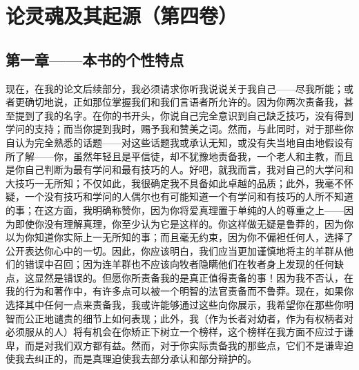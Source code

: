 

\section{论灵魂及其起源（第四卷）}

\par

\par


\subsection{第一章——本书的个性特点}

现在，在我的论文后续部分，我必须请求你听我说说关于我自己——尽我所能；或者更确切地说，正如那位掌握我们和我们言语者所允许的。因为你两次责备我，甚至提到了我的名字。在你的书开头，你说自己完全意识到自己缺乏技巧，没有得到学问的支持；而当你提到我时，赐予我和赞美之词。然而，与此同时，对于那些你自认为完全熟悉的话题——对这些话题我或承认无知，或没有失当地自由地假设有所了解——你，虽然年轻且是平信徒，却不犹豫地责备我，一个老人和主教，而且是你自己判断为最有学问和最有技巧的人。好吧，就我而言，我对自己的大学问和大技巧一无所知；不仅如此，我很确定我不具备如此卓越的品质；此外，我毫不怀疑，一个没有技巧和学问的人偶尔也有可能知道一个有学问和有技巧的人所不知道的事；在这方面，我明确称赞你，因为你将爱真理置于单纯的人的尊重之上——因为即使你没有理解真理，你至少认为它是这样的。你这样做无疑是鲁莽的，因为你以为你知道你实际上一无所知的事；而且毫无约束，因为你不偏袒任何人，选择了公开表达你心中的一切。因此，你应该明白，我们应当更加谨慎地将主的羊群从他们的错误中召回；因为连羊群也不应该向牧者隐瞒他们在牧者身上发现的任何缺点，这显然是错误的。但愿你所责备我的是真正值得责备的事！因为我不否认，在我的行为和著作中，有许多点可以被一个明智的法官责备而不鲁莽。现在，如果你选择其中任何一点来责备我，我或许能够通过这些向你展示，我希望你在那些你明智而公正地谴责的细节上如何表现；此外，我（作为长者对幼者，作为有权柄者对必须服从的人）将有机会在你矫正下树立一个榜样，这个榜样在我方面不应过于谦卑，而是对我们双方都有益。然而，对于你实际责备我的那些点，它们不是谦卑迫使我去纠正的，而是真理迫使我去部分承认和部分辩护的。\par

